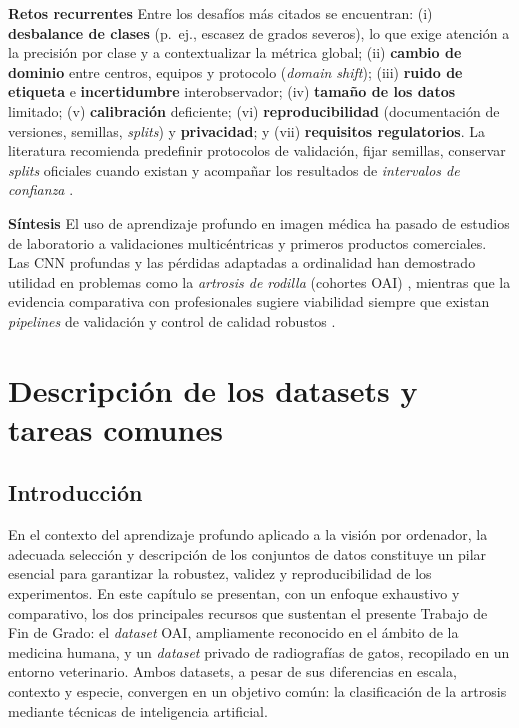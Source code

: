 \documentclass[11pt,spanish,listoffigures,listoftables]{tfgetsinf}
\begin{document}
\medskip
\noindent\textbf{Retos recurrentes} Entre los desafíos más citados se encuentran: (i) \textbf{desbalance de clases} (p.~ej., escasez de grados severos), lo que exige atención a la precisión por clase y a contextualizar la métrica global; (ii) \textbf{cambio de dominio} entre centros, equipos y protocolo (\emph{domain shift}); (iii) \textbf{ruido de etiqueta} e \textbf{incertidumbre} interobservador; (iv) \textbf{tamaño de los datos} limitado; (v) \textbf{calibración} deficiente; (vi) \textbf{reproducibilidad} (documentación de versiones, semillas, \emph{splits}) y \textbf{privacidad}; y (vii) \textbf{requisitos regulatorios}. La literatura recomienda predefinir protocolos de validación, fijar semillas, conservar \emph{splits} oficiales cuando existan y acompañar los resultados de \emph{intervalos de confianza} \cite{liu_meta_analysis}.

\medskip
\noindent\textbf{Síntesis} El uso de aprendizaje profundo en imagen médica ha pasado de estudios de laboratorio a validaciones multicéntricas y primeros productos comerciales. Las CNN profundas y las pérdidas adaptadas a ordinalidad han demostrado utilidad en problemas como la \emph{artrosis de rodilla} (cohortes OAI) \cite{niamsOAI,chen2019fully}, mientras que la evidencia comparativa con profesionales sugiere viabilidad siempre que existan \emph{pipelines} de validación y control de calidad robustos \cite{liu_meta_analysis}.


\chapter{Descripción de los datasets y tareas comunes}
\label{chap:corpus}

\section{Introducción}
\label{sec:3_1_introduccion}

En el contexto del aprendizaje profundo aplicado a la visión por ordenador, la
adecuada selección y descripción de los conjuntos de datos constituye un pilar
esencial para garantizar la robustez, validez y reproducibilidad de los
experimentos. En este capítulo se presentan, con un enfoque exhaustivo y
comparativo, los dos principales recursos que sustentan el presente Trabajo de
Fin de Grado: el \textit{dataset} OAI, ampliamente reconocido en el ámbito de
la medicina humana, y un \textit{dataset} privado de radiografías de gatos,
recopilado en un entorno veterinario. Ambos datasets, a pesar de sus
diferencias en escala, contexto y especie, convergen en un objetivo común: la
clasificación de la artrosis mediante técnicas de inteligencia artificial.
\end{document}
